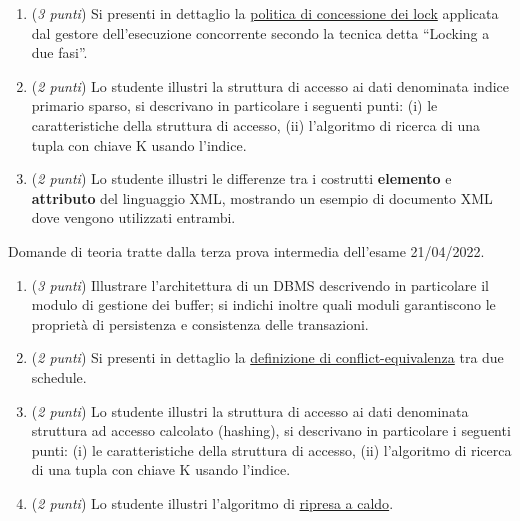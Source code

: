 \documentclass[a4paper]{article}
\newcommand{\dquotes}[1]{``#1''}
\begin{document}
\begin{enumerate}
		\item (\emph{3 punti}) Si presenti in dettaglio la \underline{politica di concessione dei lock} applicata dal gestore dell'esecuzione concorrente secondo la tecnica detta \dquotes{Locking a due fasi}.
		
		\item (\emph{2 punti}) Lo studente illustri la struttura di accesso ai dati denominata indice primario sparso, si descrivano in particolare i seguenti punti: (i) le caratteristiche della struttura di accesso, (ii) l'algoritmo di ricerca di una tupla con chiave K usando l'indice.
		
		\item (\emph{2 punti}) Lo studente illustri le differenze tra i costrutti \textbf{elemento} e \textbf{attributo} del linguaggio XML, mostrando un esempio di documento XML dove vengono utilizzati entrambi.
	\end{enumerate}\newpage
	
	Domande di teoria tratte dalla terza prova intermedia dell'esame 21/04/2022.
	\begin{enumerate}
		\item (\emph{3 punti}) Illustrare l'architettura di un DBMS descrivendo in particolare il modulo di gestione dei buffer; si indichi inoltre quali moduli garantiscono le proprietà di persistenza e consistenza delle transazioni.
		
		\item (\emph{2 punti}) Si presenti in dettaglio la \underline{definizione di conflict-equivalenza} tra due schedule.
		
		\item (\emph{2 punti}) Lo studente illustri la struttura di accesso ai dati denominata struttura ad accesso calcolato (hashing), si descrivano in particolare i seguenti punti: (i) le caratteristiche della struttura di accesso, (ii) l'algoritmo di ricerca di una tupla con chiave K usando l'indice.
		
		\item (\emph{2 punti}) Lo studente illustri l'algoritmo di \underline{ripresa a caldo}.
	\end{enumerate}\newpage
	
\end{document}
